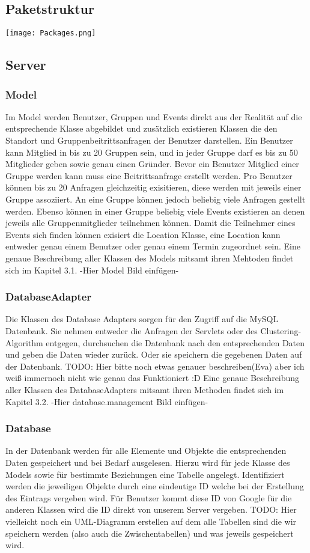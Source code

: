 	\subsection{Paketstruktur}
	 \texttt{[image: Packages.png]}
	\subsection{Server}
	\subsubsection{Model}
Im Model werden Benutzer, Gruppen und Events direkt aus der Realität auf die entsprechende Klasse abgebildet und zusätzlich existieren Klassen die den Standort und Gruppenbeitrittsanfragen der Benutzer darstellen.
Ein Benutzer kann Mitglied in bis zu 20 Gruppen sein, und in jeder Gruppe darf es bis zu 50 Mitglieder geben sowie genau einen Gründer. Bevor ein Benutzer Mitglied einer Gruppe werden kann muss eine Beitrittsanfrage erstellt werden.
Pro Benutzer können bis zu 20 Anfragen gleichzeitig exisitieren, diese werden mit jeweils einer Gruppe assoziiert.
An eine Gruppe können jedoch beliebig viele Anfragen gestellt werden.
Ebenso können in einer Gruppe beliebig viele Events existieren an denen jeweils alle Gruppenmitglieder teilnehmen können.
Damit die Teilnehmer eines Events sich finden können exisiert die Location Klasse, eine Location kann entweder genau einem Benutzer oder genau einem Termin zugeordnet sein. 
Eine genaue Beschreibung aller Klassen des Models mitsamt ihren Mehtoden findet sich im Kapitel 3.1.
-Hier Model Bild einfügen-

	\subsubsection{DatabaseAdapter}
	Die Klassen des Database Adapters sorgen für den Zugriff auf die MySQL Datenbank.
Sie nehmen entweder die Anfragen der Servlets oder des Clustering-Algorithm entgegen, durchsuchen die Datenbank nach den entsprechenden Daten und geben die Daten wieder zurück.  
Oder sie speichern die gegebenen Daten auf der Datenbank.
TODO: Hier bitte noch etwas genauer beschreiben(Eva) aber ich weiß immernoch nicht wie genau das Funktioniert :D
Eine genaue Beschreibung aller Klassen des DatabaseAdapters mitsamt ihren Methoden findet sich im Kapitel 3.2.
-Hier database.management Bild einfügen-

	\subsubsection{Database}
	In der Datenbank werden für alle Elemente und Objekte die entsprechenden Daten gespeichert und bei Bedarf ausgelesen. Hierzu wird für jede Klasse des Models sowie für bestimmte Beziehungen eine Tabelle angelegt.
Identifiziert werden die jeweiligen Objekte durch eine eindeutige ID welche bei der Erstellung des Eintrags vergeben wird.
Für Benutzer kommt diese ID von Google für die anderen Klassen wird die ID direkt von unserem Server vergeben.
TODO: Hier vielleicht noch ein UML-Diagramm erstellen auf dem alle Tabellen sind die wir speichern werden (also auch die Zwischentabellen) und was jeweils gespeichert wird.

